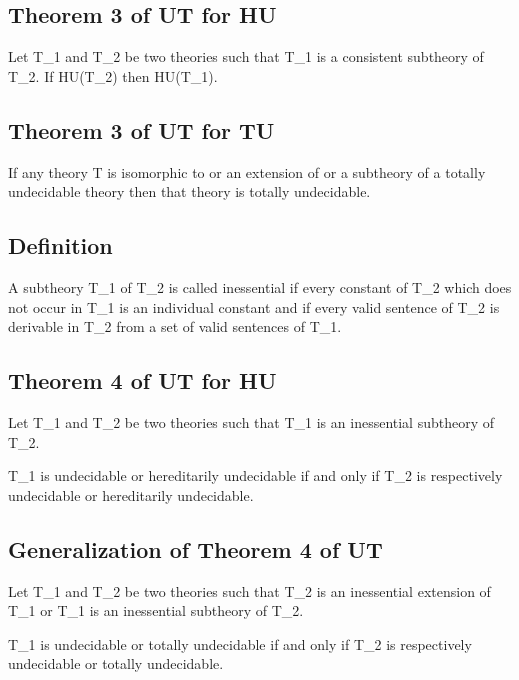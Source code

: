 \hypertarget{theorem-3-of-ut-for-hu}{%
\subsection{Theorem 3 of UT for HU}\label{theorem-3-of-ut-for-hu}}

Let T\_1 and T\_2 be two theories such that T\_1 is a consistent
subtheory of T\_2. If HU(T\_2) then HU(T\_1).

\hypertarget{theorem-3-of-ut-for-tu}{%
\subsection{Theorem 3 of UT for TU}\label{theorem-3-of-ut-for-tu}}

If any theory T is isomorphic to or an extension of or a subtheory of a
totally undecidable theory then that theory is totally undecidable.

\hypertarget{definition}{%
\subsection{Definition}\label{definition}}

A subtheory T\_1 of T\_2 is called inessential if every constant of T\_2
which does not occur in T\_1 is an individual constant and if every
valid sentence of T\_2 is derivable in T\_2 from a set of valid
sentences of T\_1.

\hypertarget{theorem-4-of-ut-for-hu}{%
\subsection{Theorem 4 of UT for HU}\label{theorem-4-of-ut-for-hu}}

Let T\_1 and T\_2 be two theories such that T\_1 is an inessential
subtheory of T\_2.

T\_1 is undecidable or hereditarily undecidable if and only if T\_2 is
respectively undecidable or hereditarily undecidable.

\hypertarget{generalization-of-theorem-4-of-ut}{%
\subsection{Generalization of Theorem 4 of
UT}\label{generalization-of-theorem-4-of-ut}}

Let T\_1 and T\_2 be two theories such that T\_2 is an inessential
extension of T\_1 or T\_1 is an inessential subtheory of T\_2.

T\_1 is undecidable or totally undecidable if and only if T\_2 is
respectively undecidable or totally undecidable.


